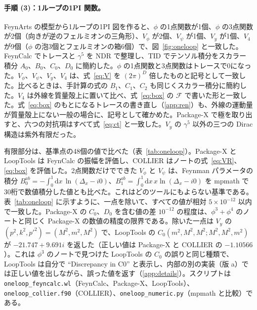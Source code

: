 \documentclass[a4paper,10pt]{ltjsarticle}
\newcommand{\dd}{\mathrm{d}}
\begin{document}
\paragraph{手順 (3)：1ループの1PI 関数。}FeynArts の模型から1ループの1PI 図を作ると、$\phi$ の1点関数が1個、$\phi$ の3点関数が2個（向きが逆のフェルミオンの三角形）、$V_\phi$ が2個、$V_\psi$ が1個、$V_y$ が1個、$V_4$ が9個（$\phi$ の泡3個とフェルミオンの箱6個）で、図~\ref{fig:oneloop} と一致した。FeynCalc でトレースと $\gamma^5$ を NDR で整理し、TID でテンソル積分をスカラー積分 $A_0$、$B_0$、$C_0$、$D_0$ に簡約した。$\phi$ の1点関数と3点関数はトレースで0になった。$V_\phi$、$V_\psi$、$V_y$、$V_4$ は、式~\eqref{eq:V} を $(2\pi)^D$ 倍したものと記号として一致した。比べるときは、手計算の式の $B_1$、$C_1$、$C_2$ も同じくスカラー積分に簡約した。$V_4$ は外線を質量殻上に置いて比べ、式~\eqref{eq:box} の $\mathcal F$ で書いた形と一致した。式~\eqref{eq:box} のもとになるトレースの書き直し（\ref{app:ren}）も、外線の運動量が質量殻上にない一般の場合に、記号として確かめた。Package-X で極を取り出すと、六つの対抗項はすべて式~\eqref{eq:ct} と一致した。$V_y$ の $\gamma^5$ 以外の三つの Dirac 構造は紫外有限だった。

有限部分は、基準点の48個の値で比べた（表~\ref{tab:oneloop}）。Package-X と LoopTools は FeynCalc の振幅を評価し、COLLIER はノートの式~\eqref{eq:VR}、\eqref{eq:box} を評価した。2点関数だけでできた $V_\phi$ と $V_\psi$ は、Feynman パラメータの積分 $B_0^{ab}=-\int_0^1\dd x\,\ln(\Delta_x-i0)$、$B_1^{ab}=\int_0^1\dd x\,x\ln(\Delta_x-i0)$ を mpmath で30桁で数値積分した値とも比べた。これはどのツールにもよらない基準である。表~\ref{tab:oneloop} に示すように、一点を除いて、すべての値が相対 $5\times10^{-12}$ 以内で一致した。Package-X の $C_0$、$D_0$ を含む値の差 $10^{-12}$ の程度は、$\phi^3+\phi^4$ のノートと同じく Package-X の数値の精度の限界である。除いた一点は $V_y$ の $(p^2,k^2,p'^2)=(M^2,m^2,M^2)$ で、LoopTools の $C_0(m^2,M^2,M^2;M^2,M^2,m^2)$ が $-21.747+9.691i$ を返した（正しい値は Package-X と COLLIER の $-1.10566$）。これは $\phi^3$ のノートで見つけた LoopTools の $C_0$ の誤りと同じ種類で、LoopTools は自分で ``Discrepancy in C0'' と表示し、内部の別の実装（版 a）では正しい値を出しながら、誤った値を返す（\ref{app:details}）。スクリプトは \texttt{oneloop\_feyncalc.wl}（FeynCalc、Package-X、LoopTools）、\texttt{oneloop\_collier.f90}（COLLIER）、\texttt{oneloop\_numeric.py}（mpmath と比較）である。
\end{document}
